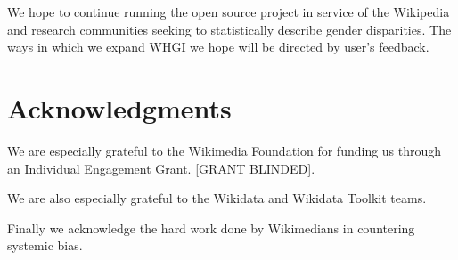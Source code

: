 \documentclass{sig-alternate-05-2015}
\begin{document}
We hope to continue running the open source project in service of the Wikipedia and research communities seeking to statistically describe gender disparities. The ways in which we expand WHGI we hope will be directed by user's feedback.

\section{ Acknowledgments}

We are especially grateful to the Wikimedia Foundation for funding us through
an Individual Engagement Grant. [GRANT BLINDED].

We are also especially grateful to the Wikidata and Wikidata Toolkit teams.

Finally we acknowledge the hard work done by Wikimedians in countering
systemic bias.


%

\end{document}
